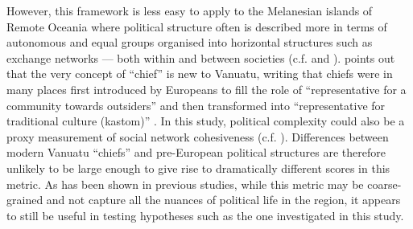 \documentclass[unnumsec,webpdf,modern,medium]{oup-authoring-template}
\begin{document}
\begin{appendices}
However, this framework is less easy to apply to the Melanesian islands of Remote Oceania where political structure often is described more in terms of autonomous and equal groups organised into horizontal structures such as exchange networks --- both within and between societies (c.f. \citet{bonnemaison1996graded} and \citet{huffman1996trading}). \citet{bolton1998chief} points out that the very concept of ``chief'' is new to Vanuatu, writing that chiefs were in many places first introduced by Europeans to fill the role of ``representative for a community towards outsiders'' and then transformed into ``representative for traditional culture (kastom)'' \citep[185]{bolton1998chief}. In this study, political complexity could also be a proxy measurement of social network cohesiveness (c.f. \citet{grace_1992_aberrant}). Differences between modern Vanuatu ``chiefs'' and pre-European political structures are therefore unlikely to be large enough to give rise to dramatically different scores in this metric. As has been shown in previous studies, while this metric may be coarse-grained and not capture all the nuances of political life in the region, it appears to still be useful in testing hypotheses such as the one investigated in this study.





\end{appendices}
\end{document}
